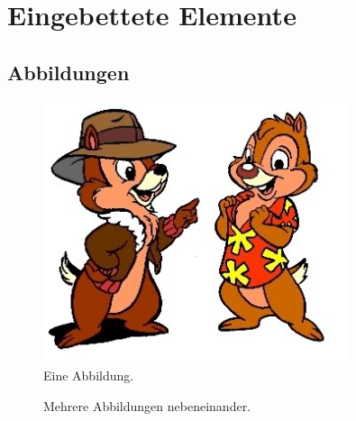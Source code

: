 \section{Eingebettete Elemente}

\subsection{Abbildungen}

\begin{figure}[h]
	\centering
	\includegraphics[width=0.8\textwidth]{Abbildungen/ChipAndDale_small.png}
	\caption{Eine Abbildung.}
	\label{figure:Logo1}
\end{figure}

\begin{figure}[h]
	\centering
 	\hfill
	\hfill
	\hfill
	\caption{Mehrere Abbildungen nebeneinander.}
	\label{figure:Logo2}
\end{figure}

